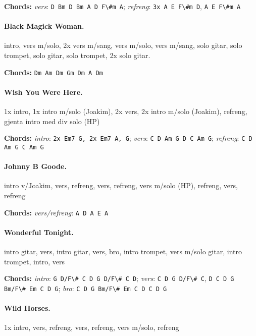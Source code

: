 \documentclass[%
twoside,                 %
final,                   %
10pt]{article}
\begin{document}
\textbf{Chords:} \emph{vers}: \Verb!D Bm D Bm A D F\#m A!;
\emph{refreng}: \Verb!3x A E F\#m D!, \Verb!A E F\#m A!





\paragraph{Black Magick Woman.}
intro, vers m/solo, 2x vers m/sang, vers m/solo, vers m/sang, solo gitar, solo trompet, solo gitar, solo trompet, 2x solo gitar.

\textbf{Chords:} \Verb!Dm Am Dm Gm Dm A Dm!






\paragraph{Wish You Were Here.}
1x intro, 1x intro m/solo (Joakim), 2x vers, 2x intro m/solo (Joakim), refreng,
gjenta intro med div solo (HP)


\textbf{Chords:} \emph{intro}: \Verb!2x Em7 G, 2x Em7 A, G!;
\emph{vers}: \Verb!C D Am G D C Am G!; \emph{refreng}: \Verb!C D Am G C Am G!





\paragraph{Johnny B Goode.}
intro v/Joakim, vers, refreng, vers, refreng, vers m/solo (HP), refreng,
vers, refreng

\textbf{Chords:} \emph{vers/refreng}: \Verb!A D A E A!


\paragraph{Wonderful Tonight.}
intro gitar, vers, intro gitar, vers, bro, intro trompet, vers m/solo gitar, intro trompet, intro, vers

\textbf{Chords:} \emph{intro}: \Verb!G D/F\# C D G D/F\# C D!;
\emph{vers}:
\Verb!C D G D/F\# C!, \Verb!D C D G Bm/F\# Em C D G!;
\emph{bro}: \Verb!C D G Bm/F\# Em C D C D G!




\paragraph{Wild Horses.}
1x intro, vers, refreng, vers, refreng, vers m/solo, refreng
\end{document}
